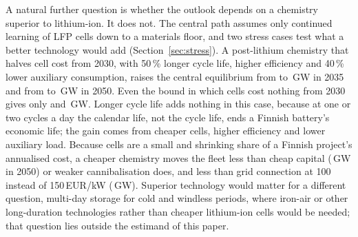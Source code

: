 \documentclass[11pt]{article}
\newcommand{\EUR}{EUR}
\begin{document}
A natural further question is whether the outlook depends on a chemistry superior to lithium-ion. It does not. The central path assumes only continued learning of LFP cells down to a materials floor, and two stress cases test what a better technology would add (Section~\ref{sec:stress}). A post-lithium chemistry that halves cell cost from 2030, with 50\,\% longer cycle life, higher efficiency and 40\,\% lower auxiliary consumption, raises the central equilibrium from  to \,GW in 2035 and from  to \,GW in 2050. Even the bound in which cells cost nothing from 2030 gives only  and \,GW. Longer cycle life adds nothing in this case, because at one or two cycles a day the calendar life, not the cycle life, ends a Finnish battery's economic life; the gain comes from cheaper cells, higher efficiency and lower auxiliary load. Because cells are a small and shrinking share of a Finnish project's annualised cost, a cheaper chemistry moves the fleet less than cheap capital (\,GW in 2050) or weaker cannibalisation does, and less than grid connection at 100 instead of 150\,\EUR/kW (\,GW). Superior technology would matter for a different question, multi-day storage for cold and windless periods, where iron-air or other long-duration technologies rather than cheaper lithium-ion cells would be needed; that question lies outside the estimand of this paper.
\end{document}
